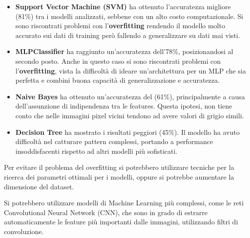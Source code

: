 \documentclass{article}
\begin{document}
\begin{itemize}
    \item \textbf{Support Vector Machine (SVM)} ha ottenuto l'accuratezza migliore (81\%) tra i 
    modelli analizzati, sebbene con un alto costo computazionale. Si sono riscontrati problemi con l'\textbf{overfitting} 
    rendendo il modello molto accurato sui dati di training però fallendo a generalizzare su dati mai visti.
    
    \item \textbf{MLPClassifier} ha raggiunto un'accuratezza dell'78\%, posizionandosi al secondo 
    posto. Anche in questo caso si sono riscontrati problemi con l'\textbf{overfitting}, 
    vista la difficoltà di ideare un'architettura per un MLP che sia perfetta e combini buona capacità di generalizzazione e 
    accuratezza. 
    
    \item \textbf{Naive Bayes} ha ottenuto un'accuratezza del (61\%), principalmente a causa 
    dell'assunzione di indipendenza tra le features. 
    Questa ipotesi, non tiene conto che nelle immagini pixel vicini tendono ad avere valori di grigio simili.
    
    \item \textbf{Decision Tree} ha mostrato i risultati peggiori (45\%). 
    Il modello ha avuto difficoltà nel catturare pattern complessi, portando a performance 
    insoddisfacenti rispetto ad altri modelli più sofisticati. 
\end{itemize}

Per evitare il problema del overfitting si potrebbero utilizzare tecniche per la ricerca dei parametri 
ottimali per i modelli, oppure si potrebbe aumentare la dimensione del dataset. 

Si potrebbero utilizzare modelli di Machine Learning più complessi, come le reti Convolutional Neural Network (CNN), 
che sono in grado di estrarre automaticamente le feature più importanti dalle immagini, utilizzando 
filtri di convoluzione. 
\end{document}
